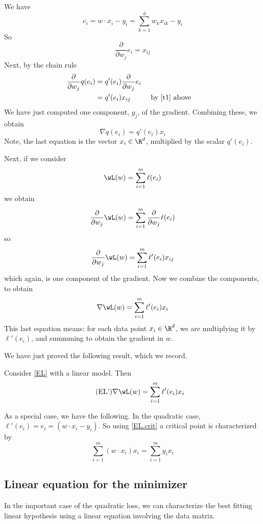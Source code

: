 \documentclass[12pt]{amsart}
\begin{document}
We have 
\[
e_i = w\cdot x_i - y_i = \sum_{k=1}^d w_k x_{ik} - y_i
\]
So
\begin{equation}\label{t1}\tag{*}
	\frac{\partial}{\partial w_j} e_i = x_{ij}
\end{equation}
Next, by the chain rule
\begin{align}
\frac{\partial}{\partial w_j} q(e_i) 
&= q'(e_i) \frac{\partial}{\partial w_j} e_i \\
& = q'(e_i) x_{ij} && \text{ by \eqref{t1} above} 
\end{align}
We have just computed one component, $g_j$, of the gradient.  Combining these, we obtain
\[
\nabla q(e_i) = q'(e_i)x_i
\]
Note, the last equation is the vector $x_i \in \R^d$, multiplied by the scalar $q'(e_i)$. 

Next, if we consider 
\[
\wL(w) = \sum_{i=1}^m \ell(e_i)
\]
we obtain
\begin{align}
	\frac{\partial}{\partial w_j}  \wL(w)=  \sum_{i=1}^m  \frac{\partial}{\partial w_j} \ell(e_i)
\end{align}
so
\begin{align}
	\frac{\partial}{\partial w_j}  \wL(w)=  \sum_{i=1}^m  \ell'(e_i) x_{ij}
\end{align}
which again, is one component of the gradient.  Now we combine the components, to obtain
\begin{equation}
	\nabla \wL(w) =  \sum_{i=1}^m  \ell'(e_i) x_i
\end{equation}
This last equation means: for each data point $x_i \in \R^d$, we are multiplying it by $\ell'(e_i)$, and summming to obtain the gradient in $w$. 

We have just proved the following result, which we record.
\begin{theorem}
	Consider \eqref{EL} with a linear model.  Then 
\begin{equation}\label{EL.crit}\tag{EL'}
	\nabla \wL(w) =  \sum_{i=1}^m  \ell'(e_i) x_i
\end{equation}	
 \end{theorem}


As a special case, we have the following.  In the quadratic case, $\ell'(e_i) = e_i = (w\cdot x_i - y_i)$.  So 
using \eqref{EL.crit} a critical point is characterized by 
\begin{equation}\label{EL.crit.q}\tag{QEL'}
  \sum_{i=1}^m  (w\cdot x_i) x_i =   \sum_{i=1}^m y_i x_i 
\end{equation}


\subsection{Linear equation for the minimizer}
In the important case of the quadratic loss, we can characterize the best fitting linear hypothesis using a linear equation involving the data matrix.
\end{document}
